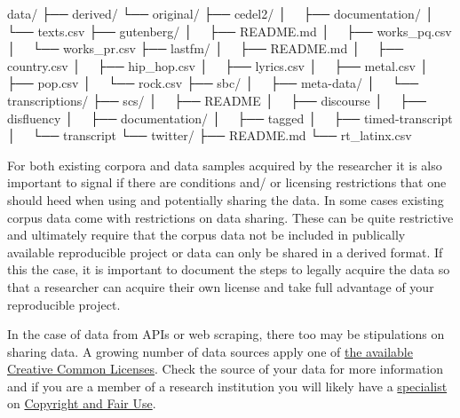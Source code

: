 \documentclass[
  letterpaper,
]{latex/krantz}
\newenvironment{Shaded}{\begin{snugshade}}{\end{snugshade}}
\newcommand{\ExtensionTok}[1]{\textcolor[rgb]{0.00,0.23,0.31}{#1}}
\newcommand{\NormalTok}[1]{\textcolor[rgb]{0.00,0.23,0.31}{#1}}
\begin{document}
\begin{Shaded}
\begin{Highlighting}[]
\ExtensionTok{data/}
\ExtensionTok{├──}\NormalTok{ derived/}
\ExtensionTok{└──}\NormalTok{ original/}
    \ExtensionTok{├──}\NormalTok{ cedel2/}
    \ExtensionTok{│  }\NormalTok{ ├── documentation/}
    \ExtensionTok{│  }\NormalTok{ └── texts.csv}
    \ExtensionTok{├──}\NormalTok{ gutenberg/}
    \ExtensionTok{│  }\NormalTok{ ├── README.md}
    \ExtensionTok{│  }\NormalTok{ ├── works\_pq.csv}
    \ExtensionTok{│  }\NormalTok{ └── works\_pr.csv}
    \ExtensionTok{├──}\NormalTok{ lastfm/}
    \ExtensionTok{│  }\NormalTok{ ├── README.md}
    \ExtensionTok{│  }\NormalTok{ ├── country.csv}
    \ExtensionTok{│  }\NormalTok{ ├── hip\_hop.csv}
    \ExtensionTok{│  }\NormalTok{ ├── lyrics.csv}
    \ExtensionTok{│  }\NormalTok{ ├── metal.csv}
    \ExtensionTok{│  }\NormalTok{ ├── pop.csv}
    \ExtensionTok{│  }\NormalTok{ └── rock.csv}
    \ExtensionTok{├──}\NormalTok{ sbc/}
    \ExtensionTok{│  }\NormalTok{ ├── meta{-}data/}
    \ExtensionTok{│  }\NormalTok{ └── transcriptions/}
    \ExtensionTok{├──}\NormalTok{ scs/}
    \ExtensionTok{│  }\NormalTok{ ├── README}
    \ExtensionTok{│  }\NormalTok{ ├── discourse}
    \ExtensionTok{│  }\NormalTok{ ├── disfluency}
    \ExtensionTok{│  }\NormalTok{ ├── documentation/}
    \ExtensionTok{│  }\NormalTok{ ├── tagged}
    \ExtensionTok{│  }\NormalTok{ ├── timed{-}transcript}
    \ExtensionTok{│  }\NormalTok{ └── transcript}
    \ExtensionTok{└──}\NormalTok{ twitter/}
        \ExtensionTok{├──}\NormalTok{ README.md}
        \ExtensionTok{└──}\NormalTok{ rt\_latinx.csv}
\end{Highlighting}
\end{Shaded}

For both existing corpora and data samples acquired by the researcher it
is also important to signal if there are conditions and/ or licensing
restrictions that one should heed when using and potentially sharing the
data. In some cases existing corpus data come with restrictions on data
sharing. These can be quite restrictive and ultimately require that the
corpus data not be included in publically available reproducible project
or data can only be shared in a derived format. If this the case, it is
important to document the steps to legally acquire the data so that a
researcher can acquire their own license and take full advantage of your
reproducible project.

In the case of data from APIs or web scraping, there too may be
stipulations on sharing data. A growing number of data sources apply one
of \href{https://creativecommons.org/about/cclicenses/}{the available
Creative Common Licenses}. Check the source of your data for more
information and if you are a member of a research institution you will
likely have a
\href{https://zsr.wfu.edu/digital-scholarship/copyright/}{specialist} on
\href{https://www.copyright.gov/fair-use/more-info.html}{Copyright and
Fair Use}.
\end{document}
